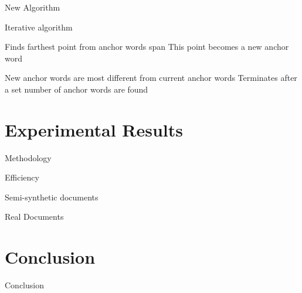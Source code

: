 \documentclass{lecture}
\begin{document}
\begin{plain}{New Algorithm}
	\begin{itemize}
		\p Iterative algorithm
		\begin{itemize}
			\p Finds farthest point from anchor words span
			\p This point becomes a new anchor word
		\end{itemize}
		\p New anchor words are most different from current anchor words
		\p Terminates after a set number of anchor words are found
	\end{itemize}
\end{plain}

\section[Results]{Experimental Results}
\begin{plain}{Methodology}
\end{plain}

\begin{plain}{Efficiency}
\end{plain}

\begin{plain}{Semi-synthetic documents}
\end{plain}

\begin{plain}{Real Documents}
\end{plain}


\section[Conclusion]{Conclusion}
\begin{plain}{Conclusion}
\end{plain}
\end{document}
